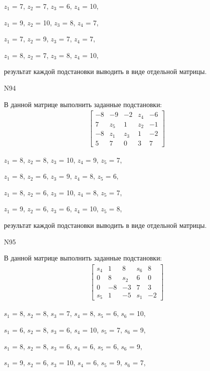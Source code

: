 \documentclass[11pt]{report}
\begin{document}
$z_{1}$ = 7, $z_{2}$ = 7, $z_{3}$ = 6, $z_{4}$ = 10, 

$z_{1}$ = 9, $z_{2}$ = 10, $z_{3}$ = 8, $z_{4}$ = 7, 

$z_{1}$ = 7, $z_{2}$ = 9, $z_{3}$ = 7, $z_{4}$ = 7, 

$z_{1}$ = 8, $z_{2}$ = 7, $z_{3}$ = 8, $z_{4}$ = 10, 

результат каждой подстановки выводить в виде отдельной матрицы.

N94

В данной матрице выполнить заданные подстановки:
\begin{align*}
\left[\begin{matrix}-8 & -9 & -2 & z_{4} & -6\\7 & z_{5} & 1 & z_{2} & -1\\-8 & z_{1} & z_{3} & 1 & -2\\5 & 7 & 0 & 3 & 7\end{matrix}\right]
\end{align*}


$z_{1}$ = 8, $z_{2}$ = 8, $z_{3}$ = 10, $z_{4}$ = 9, $z_{5}$ = 7, 

$z_{1}$ = 8, $z_{2}$ = 6, $z_{3}$ = 9, $z_{4}$ = 8, $z_{5}$ = 6, 

$z_{1}$ = 8, $z_{2}$ = 6, $z_{3}$ = 10, $z_{4}$ = 8, $z_{5}$ = 7, 

$z_{1}$ = 9, $z_{2}$ = 6, $z_{3}$ = 6, $z_{4}$ = 10, $z_{5}$ = 8, 

результат каждой подстановки выводить в виде отдельной матрицы.

N95

В данной матрице выполнить заданные подстановки:
\begin{align*}
\left[\begin{matrix}s_{4} & 1 & 8 & s_{6} & 8\\0 & 8 & s_{2} & 6 & 0\\0 & -8 & -3 & 7 & 3\\s_{5} & 1 & -5 & s_{1} & -2\end{matrix}\right]
\end{align*}


$s_{1}$ = 8, $s_{2}$ = 8, $s_{3}$ = 7, $s_{4}$ = 8, $s_{5}$ = 6, $s_{6}$ = 10, 

$s_{1}$ = 6, $s_{2}$ = 8, $s_{3}$ = 6, $s_{4}$ = 10, $s_{5}$ = 7, $s_{6}$ = 9, 

$s_{1}$ = 8, $s_{2}$ = 8, $s_{3}$ = 6, $s_{4}$ = 6, $s_{5}$ = 6, $s_{6}$ = 9, 

$s_{1}$ = 9, $s_{2}$ = 6, $s_{3}$ = 10, $s_{4}$ = 6, $s_{5}$ = 9, $s_{6}$ = 7, 
\end{document}
